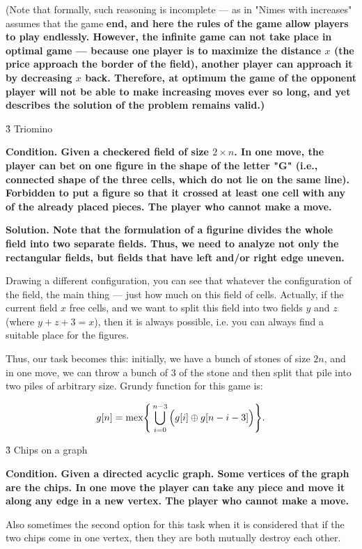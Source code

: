 (Note that formally, such reasoning is incomplete --- as in "Nimes with increases" assumes that the game \bf{end}, and here the rules of the game allow players to play endlessly. However, the infinite game can not take place in optimal game --- because one player is to maximize the distance $x$ (the price approach the border of the field), another player can approach it by decreasing $x$ back. Therefore, at optimum the game of the opponent player will not be able to make increasing moves ever so long, and yet describes the solution of the problem remains valid.)


\h3{ Triomino }

\bf{Condition}. Given a checkered field of size $2 \times n$. In one move, the player can bet on one figure in the shape of the letter "G" (i.e., connected shape of the three cells, which do not lie on the same line). Forbidden to put a figure so that it crossed at least one cell with any of the already placed pieces. The player who cannot make a move.

\bf{Solution}. Note that the formulation of a figurine divides the whole field into two separate fields. Thus, we need to analyze not only the rectangular fields, but fields that have left and/or right edge uneven.

Drawing a different configuration, you can see that whatever the configuration of the field, the main thing --- just how much on this field of cells. Actually, if the current field $x$ free cells, and we want to split this field into two fields $y$ and $z$ (where $y+z+3 = x$), then it is always possible, i.e. you can always find a suitable place for the figures.

Thus, our task becomes this: initially, we have a bunch of stones of size $2n$, and in one move, we can throw a bunch of $3$ of the stone and then split that pile into two piles of arbitrary size. Grundy function for this game is:

$$ g[n] = {\rm mex} \Bigg\{ \bigcup_{i=0}^{n-3} \Big( g[i] \oplus g[n-i-3] \Big) \Bigg\}. $$


\h3{ Chips on a graph }

\bf{Condition}. Given a directed acyclic graph. Some vertices of the graph are the chips. In one move the player can take any piece and move it along any edge in a new vertex. The player who cannot make a move.

Also sometimes the second option for this task when it is considered that if the two chips come in one vertex, then they are both mutually destroy each other.


